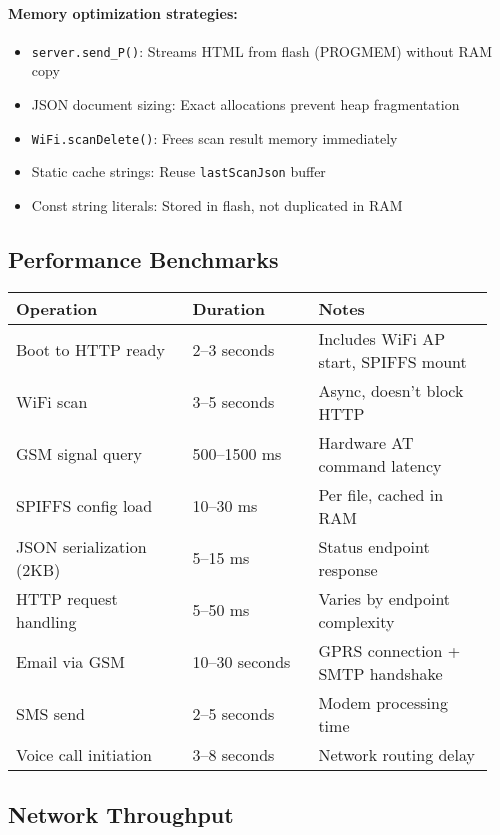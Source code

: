 \documentclass[11pt,a4paper]{article}
\begin{document}
\paragraph{Memory optimization strategies:}
\begin{itemize}[leftmargin=*]
  \item \texttt{server.send\_P()}: Streams HTML from flash (PROGMEM) without RAM copy
  \item JSON document sizing: Exact allocations prevent heap fragmentation
  \item \texttt{WiFi.scanDelete()}: Frees scan result memory immediately
  \item Static cache strings: Reuse \texttt{lastScanJson} buffer
  \item Const string literals: Stored in flash, not duplicated in RAM
\end{itemize}

\subsection{Performance Benchmarks}

\begin{longtable}{>{\raggedright\arraybackslash}p{0.35\linewidth} p{0.25\linewidth} p{0.35\linewidth}}
\hline
\textbf{Operation} & \textbf{Duration} & \textbf{Notes} \\
\hline
\endhead
Boot to HTTP ready & 2--3 seconds & Includes WiFi AP start, SPIFFS mount \\
WiFi scan & 3--5 seconds & Async, doesn't block HTTP \\
GSM signal query & 500--1500 ms & Hardware AT command latency \\
SPIFFS config load & 10--30 ms & Per file, cached in RAM \\
JSON serialization (2KB) & 5--15 ms & Status endpoint response \\
HTTP request handling & 5--50 ms & Varies by endpoint complexity \\
Email via GSM & 10--30 seconds & GPRS connection + SMTP handshake \\
SMS send & 2--5 seconds & Modem processing time \\
Voice call initiation & 3--8 seconds & Network routing delay \\
\hline
\end{longtable}

\subsection{Network Throughput}
\end{document}
